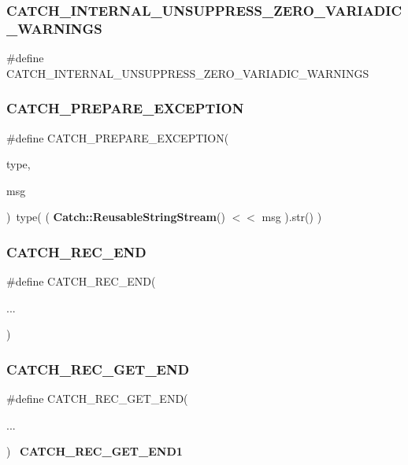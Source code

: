 \subsubsection{CATCH\_INTERNAL\_UNSUPPRESS\_ZERO\_VARIADIC\_WARNINGS}
{\footnotesize\ttfamily \#define C\+A\+T\+C\+H\+\_\+\+I\+N\+T\+E\+R\+N\+A\+L\+\_\+\+U\+N\+S\+U\+P\+P\+R\+E\+S\+S\+\_\+\+Z\+E\+R\+O\+\_\+\+V\+A\+R\+I\+A\+D\+I\+C\+\_\+\+W\+A\+R\+N\+I\+N\+GS}

\mbox{\label{catch_8hpp_a01cc18e13c75ec7b18d2a58bf074cd97}} 
\subsubsection{CATCH\_PREPARE\_EXCEPTION}
{\footnotesize\ttfamily \#define C\+A\+T\+C\+H\+\_\+\+P\+R\+E\+P\+A\+R\+E\+\_\+\+E\+X\+C\+E\+P\+T\+I\+ON(\begin{DoxyParamCaption}\item[{}]{type,  }\item[{}]{msg }\end{DoxyParamCaption})~type( ( \textbf{ Catch\+::\+Reusable\+String\+Stream}() $<$$<$ msg ).str() )}

\mbox{\label{catch_8hpp_aebb9e7be881ac3dcd10db9fb45830649}} 
\subsubsection{CATCH\_REC\_END}
{\footnotesize\ttfamily \#define C\+A\+T\+C\+H\+\_\+\+R\+E\+C\+\_\+\+E\+ND(\begin{DoxyParamCaption}\item[{}]{... }\end{DoxyParamCaption})}

\mbox{\label{catch_8hpp_a536dd24bc8e72ec8eb14c3676f20c778}} 
\subsubsection{CATCH\_REC\_GET\_END}
{\footnotesize\ttfamily \#define C\+A\+T\+C\+H\+\_\+\+R\+E\+C\+\_\+\+G\+E\+T\+\_\+\+E\+ND(\begin{DoxyParamCaption}\item[{}]{... }\end{DoxyParamCaption})~\textbf{ C\+A\+T\+C\+H\+\_\+\+R\+E\+C\+\_\+\+G\+E\+T\+\_\+\+E\+N\+D1}}

